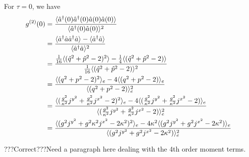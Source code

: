 \documentclass{article}
\begin{document}
\begin{enumerate}
    For $\tau = 0$, we have
    \begin{align}
                \label{g2(0)}
            \notag g^{(2)}(0) &= \frac{\langle \hat{a}^\dagger(0)\hat{a}^\dagger(0) \hat{a}(0)\hat{a}(0) \rangle}{\langle\hat{a}^\dagger(0)\hat{a}(0)\rangle^2 }\\
            \notag &= \frac{\langle \hat{a}^\dagger \hat{a} \hat{a}^\dagger \hat{a} \rangle-\langle\hat{a}^\dagger \hat{a}\rangle}{\langle\hat{a}^\dagger\hat{a}\rangle^2 }\\
            \notag&= \frac{\frac{1}{16} \langle (\hat{q}^2+\hat{p}^2-2)^2\rangle-\frac{1}{4}\langle (\hat{q}^2+\hat{p}^2-2)\rangle}{\frac{1}{16}\langle (\hat{q}^2+\hat{p}^2-2)\rangle^2 }\\
             \notag&= \frac{ \langle (q^2+p^2-2)^2\rangle_e-4\langle (q^2+p^2-2)\rangle_e}{\langle (q^2+p^2-2)\rangle_e^2 }\\
             \notag&= \frac{ \langle (\frac{g^2}{\kappa^2}j^{y^2}+\frac{g^2}{\kappa^2}j^{x^2}-2)^2\rangle_e-4\langle (\frac{g^2}{\kappa^2}j^{y^2}+\frac{g^2}{\kappa^2}j^{x^2}-2)\rangle_e}{\langle (\frac{g^2}{\kappa^2}j^{y^2}+\frac{g^2}{\kappa^2}j^{x^2}-2)\rangle_e^2 }\\
             &= \frac{ \langle (g^2j^{y^2}+g^2{\kappa^2}j^{x^2}-2\kappa^2)^2\rangle_e-4\kappa^2\langle (g^2j^{y^2}+g^2j^{x^2}-2\kappa^2)\rangle_e}{\langle (g^2j^{y^2}+g^2j^{x^2}-2\kappa^2)\rangle_e^2 }
        \end{align}
        
    ???Correct???Need a paragraph here dealing with the 4th order moment terms.
\end{enumerate}



\printbibliography
\end{document}
